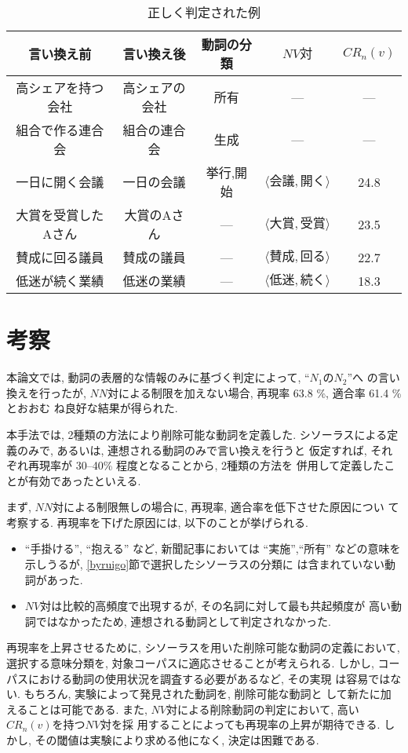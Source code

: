 \begin{table}[tbp]
 \begin{center}
 \caption{正しく判定された例}
 \label{iikaerei}
  \begin{small}
  
  \begin{tabular}{|ccccc|}
 \hline
 \multicolumn{1}{|c}{{\bf 言い換え前}} & {\bf 言い換え後} & 
 {\bf 動詞の分類} & {\bf $NV対$}
 & {\bf $CR_{n}(v)$}\\
 \hline \hline
 高シェアを持つ会社 & 高シェアの会社 & 所有 & --- & --- \\
 \hline
 組合で作る連合会 & 組合の連合会 & 生成 & --- & --- \\
 \hline
 一日に開く会議 & 一日の会議 & 挙行,開始 &
 $\langle 会議,開く\rangle$ &24.8\\
 \hline
 大賞を受賞したAさん & 大賞のAさん & --- &  
 $\langle 大賞,受賞\rangle$ & 23.5\\
 \hline
 賛成に回る議員 & 賛成の議員 & --- & $\langle 賛成, 回る 
 \rangle$ & 22.7 \\
 \hline
 低迷が続く業績 & 低迷の業績 & --- & $\langle 低迷, 続く
 \rangle$ & 18.3 \\
 \hline
  \end{tabular}
 \end{small}
 \end{center}
\end{table}


\section{考察}\label{kousatsu}
本論文では, 動詞の表層的な情報のみに基づく判定によって, ``$N_1のN_2$''へ
の言い換えを行ったが, 
$NN対$による制限を加えない場合, 再現率 63.8 \%, 適合率 61.4 \% とおおむ
ね良好な結果が得られた.

本手法では, 2種類の方法により削除可能な動詞を定義した.
シソーラスによる定義のみで, あるいは, 連想される動詞のみで言い換えを行うと
仮定すれば, それぞれ再現率が 30--40\% 程度となることから, 2種類の方法を
併用して定義したことが有効であったといえる.

まず, $NN対$による制限無しの場合に, 再現率, 適合率を低下させた原因につい
て考察する.
再現率を下げた原因には, 以下のことが挙げられる.
\begin{itemize}
\item ``手掛ける'', ``抱える'' など, 新聞記事においては ``実施'',``所有''
      などの意味を示しうるが, \ref{byruigo}節で選択したシソーラスの分類に
      は含まれていない動詞があった.
\item $NV対$は比較的高頻度で出現するが, その名詞に対して最も共起頻度が
      高い動詞ではなかったため, 連想される動詞として判定されなかった.
\end{itemize}
再現率を上昇させるために, シソーラスを用いた削除可能な動詞の定義において, 
選択する意味分類を, 対象コーパスに適応させることが考えられる.
しかし, コーパスにおける動詞の使用状況を調査する必要があるなど, その実現
は容易ではない. もちろん, 実験によって発見された動詞を, 削除可能な動詞と
して新たに加えることは可能である.
また, $NV対$による削除動詞の判定において, 高い$CR_n(v)$を持つ$NV対$を採
用することによっても再現率の上昇が期待できる.
しかし, その閾値は実験により求める他になく, 決定は困難である.

